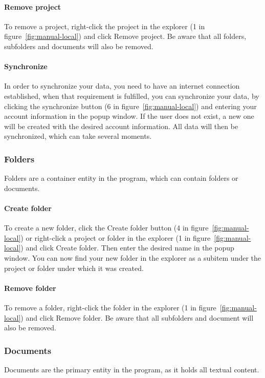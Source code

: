 	\paragraph{Remove project}
	To remove a project, right-click the project in the explorer (1 in figure~\ref{fig:manual-local}) and click Remove project. Be aware that all folders, subfolders and documents will also be removed.

	\paragraph{Synchronize}
	In order to synchronize your data, you need to have an internet connection established, when that requirement is fulfilled, you can synchronize your data, by clicking the synchronize button (6 in figure~\ref{fig:manual-local}) and entering your account information in the popup window. If the user does not exist, a new one will be created with the desired account information. All data will then be synchronized, which can take several moments.

\subsubsection{Folders}
Folders are a container entity in the program, which can contain folders or documents.

	\paragraph{Create folder}
	To create a new folder, click the Create folder button (4 in figure~\ref{fig:manual-local}) or right-click a project or folder in the explorer (1 in figure~\ref{fig:manual-local}) and click Create folder. Then enter the desired name in the popup window. You can now find your new folder in the explorer as a subitem under the project or folder under which it was created.

	\paragraph{Remove folder}
	To remove a folder, right-click the folder in the explorer (1 in figure~\ref{fig:manual-local}) and click Remove folder. Be aware that all subfolders and document will also be removed.

\subsubsection{Documents}
Documents are the primary entity in the program, as it holds all textual content.

